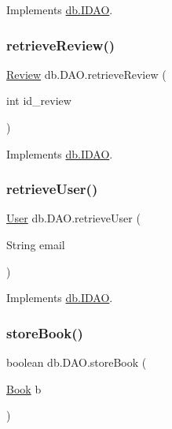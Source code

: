 Implements \hyperlink{interfacedb_1_1_i_d_a_o_a4c5eda35bfbba1b0a994efe00f99a544}{db.\+I\+D\+AO}.

\mbox{\label{classdb_1_1_d_a_o_ae43e182fae8ee7028db6ff17c2d5768f}} 
\subsubsection{\texorpdfstring{retrieve\+Review()}{retrieveReview()}}
{\footnotesize\ttfamily \hyperlink{classserver_1_1data_1_1_review}{Review} db.\+D\+A\+O.\+retrieve\+Review (\begin{DoxyParamCaption}\item[{int}]{id\+\_\+review }\end{DoxyParamCaption})}



Implements \hyperlink{interfacedb_1_1_i_d_a_o_a53fd20610d94f7c5f0f713dad7528c26}{db.\+I\+D\+AO}.

\mbox{\label{classdb_1_1_d_a_o_a6da084ffd9b0da23acba9dc68e747303}} 
\subsubsection{\texorpdfstring{retrieve\+User()}{retrieveUser()}}
{\footnotesize\ttfamily \hyperlink{classserver_1_1data_1_1_user}{User} db.\+D\+A\+O.\+retrieve\+User (\begin{DoxyParamCaption}\item[{String}]{email }\end{DoxyParamCaption})}



Implements \hyperlink{interfacedb_1_1_i_d_a_o_ad00bb5255d0badadbf5244799c3b708f}{db.\+I\+D\+AO}.

\mbox{\label{classdb_1_1_d_a_o_a036246b8124d7ac8a36e3eaafd3eb81a}} 
\subsubsection{\texorpdfstring{store\+Book()}{storeBook()}}
{\footnotesize\ttfamily boolean db.\+D\+A\+O.\+store\+Book (\begin{DoxyParamCaption}\item[{\hyperlink{classserver_1_1data_1_1_book}{Book}}]{b }\end{DoxyParamCaption})}



